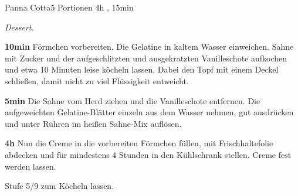 \documentclass[../recipe-collections/cooking.tex]{subfiles}
\begin{document}
\begin{recipe}{Panna Cotta}{5 Portionen }{4h , 15min }

  \freeform{}\textit{Dessert.}


  \textbf{10min}
  Förmchen vorbereiten.
  Die Gelatine in kaltem Wasser einweichen.
  Sahne mit Zucker und der aufgeschlitzten und ausgekratzten Vanilleschote aufkochen und etwa 10 Minuten leise köcheln lassen.
  Dabei den Topf mit einem Deckel schließen, damit nicht zu viel Flüssigkeit entweicht.

  \newstep{}\textbf{5min}
  Die Sahne vom Herd ziehen und die Vanilleschote entfernen.
  Die aufgeweichten Gelatine-Blätter einzeln aus dem Wasser nehmen, gut ausdrücken und unter Rühren im heißen Sahne-Mix auflösen.

  \newstep{}\textbf{4h}
  Nun die Creme in die vorbereiten Förmchen füllen, mit Frischhaltefolie abdecken und für mindestens 4 Stunden in den Kühlschrank stellen.
  Creme fest werden lassen.

  \freeform{}\hrulefill{}

  \freeform{}
  Stufe 5/9 zum Köcheln lassen.

\end{recipe}
\end{document}
